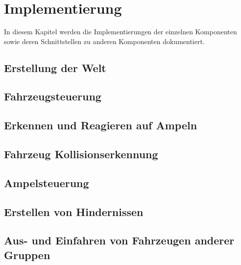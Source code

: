 
\chapter{Implementierung}
\label{Implementierung}

In diesem Kapitel werden die Implementierungen der einzelnen Komponenten sowie deren Schnittstellen zu anderen Komponenten dokumentiert.

\thispagestyle{standard}
\pagestyle{standard}

\section{Erstellung der Welt}
\label{Erstellung der Welt}

\section{Fahrzeugsteuerung}
\label{Fahrzeugsteuerung}

\section{Erkennen und Reagieren auf Ampeln}
\label{Erkennen und Reagieren auf Ampeln}

\section{Fahrzeug Kollisionserkennung}
\label{Fahrzeug Kollisionserkennung}

\section{Ampelsteuerung}
\label{Ampelsteuerung}

\section{Erstellen von Hindernissen}
\label{Erstellen von Hindernissen}

\section{Aus- und Einfahren von Fahrzeugen anderer Gruppen}
\label{Aus- und Einfahren von Fahrzeugen anderer Gruppen}